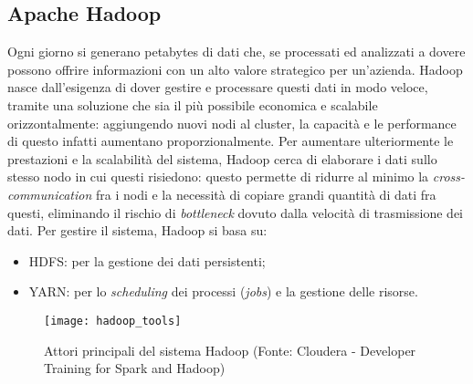 \subsection{Apache Hadoop}
Ogni giorno si generano petabytes di dati che, se processati ed analizzati a dovere possono offrire informazioni con un alto valore strategico per un'azienda. Hadoop nasce dall'esigenza di dover gestire e processare questi dati in modo veloce, tramite una soluzione che sia il più possibile economica e scalabile orizzontalmente: aggiungendo nuovi nodi al \gls{cluster}, la capacità e le performance di questo infatti aumentano proporzionalmente. Per aumentare ulteriormente le prestazioni e la scalabilità del sistema, Hadoop cerca di elaborare i dati sullo stesso nodo in cui questi risiedono: questo permette di ridurre al minimo la \textit{cross-communication} fra i nodi e la necessità di copiare grandi quantità di dati fra questi, eliminando il rischio di \textit{bottleneck} dovuto dalla velocità di trasmissione dei dati. Per gestire il sistema, Hadoop si basa su:
\begin{itemize}
	\item \gls{HDFS}: per la gestione dei dati persistenti;
	\item YARN: per lo \textit{scheduling} dei processi (\textit{jobs}) e la gestione delle risorse.
\end{itemize}
\begin{figure}[!h]
	\centering 
	\texttt{[image: hadoop\_tools]}
	\caption{Attori principali del sistema Hadoop (Fonte: Cloudera - Developer Training for Spark and Hadoop)}
\end{figure}

